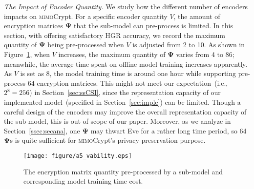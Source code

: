 \documentclass[conference,compsoc]{IEEEtran}
\newcommand{\sname}{\textsc{mimo}Crypt\xspace}
\newcommand{\rev}[1]{{\color{blue}#1}}      %
\newcommand{\rev}[1]{#1}
\begin{document}
%

\vspace{1ex}
\noindent\emph{The Impact of Encoder Quantity.}
%
We study how the different number of encoders impacts on \sname.
For a specific encoder quantity $V$, the amount of encryption matrices $\bm{\Psi}$ that the sub-model can pre-process is limited. 
In this section, with offering satisfactory HGR accuracy, we record the maximum quantity of $\bm{\Psi}$ being pre-processed when $V$ is adjusted from 2 to 10. As shown in Figure~\ref{fig:submodelNumber}, when $V$ increases, the maximum quantity of $\bm{\Psi}$ varies from 4 to 86; meanwhile, the average time spent on offline model training increases apparently. As $V$ is set as 8, the model training time is around one hour while supporting pre-process 64 encryption matrices. This might not meet our expectation~(i.e., $2^8 = 256$) in Section~\ref{sec:ssCSI}, since the representation capacity of our implemented model~(specified in Section~\ref{sec:imple}) can be limited. Though a careful design of the encoders may improve the overall representation capacity of the sub-model, this is out of scope of our paper.
Moreover, as we analyze in Section~\ref{ssec:secana}, one $\bm{\Psi}$ may thwart Eve for a rather long time period, 
so 64 $\bm{\Psi}$s is quite sufficient for \sname's privacy-preservation purpose.
%
\begin{figure}[h]
	\setlength\abovecaptionskip{8pt}
	\centering
	\texttt{[image: figure/a5\_vability.eps]}
	\caption{The encryption matrix quantity pre-processed by a sub-model and corresponding model training time cost.}
	\label{fig:submodelNumber}
\end{figure}



\end{document}
